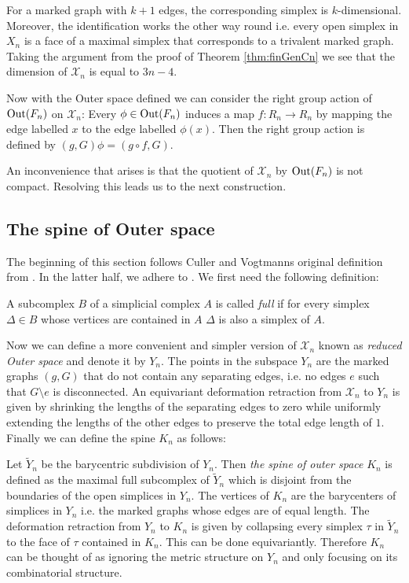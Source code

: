 For a marked graph with $k+1$ edges, the corresponding simplex is $k$-dimensional.
Moreover, the identification works the other way round i.e. every open simplex in $X_{n}$ 
is a face of a maximal simplex that corresponds to a trivalent marked graph.
Taking the argument from the proof of Theorem \ref{thm:finGenCn} we see that the dimension of $\mathcal{X}_{n}$ is equal to $3n -4$.

Now with the Outer space defined we can consider the right group action of $\operatorname{Out}(F_{n})$ on $\mathcal{X}_{n}$:
Every $\phi \in \operatorname{Out}(F_{n})$ induces a map $f: R_{n} \to R_{n}$ by mapping the edge labelled
$x$ to the edge labelled $\phi(x)$.
Then the right group action is defined by $(g,G) \phi = (g \circ f, G)$.

An inconvenience that arises is that the quotient of $\mathcal{X}_{n}$ by $\operatorname{Out}(F_{n})$ is not compact.
Resolving this leads us to the next construction.

\subsection{The spine of Outer space}
The beginning of this section follows Culler and Vogtmanns original definition from \cite{vogtmann86}.
In the latter half, we adhere to \cite{vogtmann16}. We first need the following definition:
\begin{definition}
	A subcomplex $B$ of a simplicial complex $A$ is called \emph{full} if for every simplex $\Delta \in B$ whose vertices are contained in $A$ $\Delta$ is also a simplex of $A$.
\end{definition}
Now we can define a more convenient and simpler version of $\mathcal{X}_{n}$ known as \emph{reduced Outer space} and denote it by $Y_{n}$.
The points in the subspace $Y_{n}$ are the marked graphs $(g,G)$ that do not contain any separating edges, i.e.
no edges $e$ such that $G \setminus e$ is disconnected.
An equivariant deformation retraction from $\mathcal{X}_{n}$ to $Y_{n}$ is given by shrinking the lengths of
the separating edges to zero while uniformly extending the lengths of the other edges to preserve the total edge length of $1$.
Finally we can define the spine $K_{n}$ as follows:
\begin{definition}
	Let $\widetilde{Y}_{n}$ be the barycentric subdivision of $Y_{n}$.
	Then \emph{the spine of outer space} $K_{n}$ is defined as the maximal full subcomplex of $\widetilde{Y}_{n}$ which is disjoint from the boundaries of the open simplices in $Y_{n}$.
	The vertices of $K_{n}$ are the barycenters of simplices in $Y_{n}$ i.e. the marked graphs whose edges are of equal length.
	The deformation retraction from $Y_{n}$ to $K_{n}$ is given by
	collapsing every simplex $\tau$ in $\widetilde{Y}_{n}$ to the face of $\tau$ contained in $K_{n}$.
	This can be done equivariantly.
	Therefore $K_{n}$ can be thought of as ignoring the metric structure on $Y_{n}$ and only focusing on its combinatorial structure.
\end{definition}

